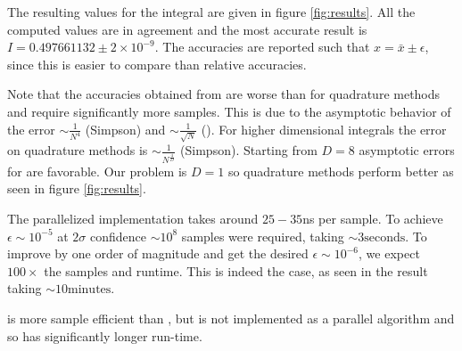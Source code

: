 \documentclass[10pt, a4paper]{article}
\newcommand{\final}{$I = 0.497661132 \pm 2\times10^{-9}$}
\begin{document}
  The resulting values for the integral are given in figure \ref{fig:results}. All the computed values
  are in agreement and the most accurate result is \final. The accuracies are reported such that
  $x = \bar x \pm \epsilon$, since this is easier to compare than relative accuracies.

  Note that the accuracies obtained from \is{} are worse than for quadrature methods and require
  significantly more samples. This is due to the asymptotic behavior of the error $\sim \frac{1}{N^4}$
  (Simpson) and $\sim \frac{1}{\sqrt{N}}$ (\is). For higher dimensional integrals the error on quadrature
  methods is $\sim \frac{1}{N^{\frac4D}}$ (Simpson). Starting from $D=8$ asymptotic errors for \is{}
  are favorable. Our problem is $D=1$ so quadrature methods perform better as seen in figure \ref{fig:results}.

  The parallelized \is{} implementation takes around $25-35$ns per sample. To achieve $\epsilon \sim 10^{-5}$
  at $2\sigma$ confidence $\sim 10^{8}$ samples were required, taking $\sim 3\text{seconds}$. To improve
  by one order of magnitude and get the desired $\epsilon \sim 10^{-6}$, we expect $100\times$ the
  samples and runtime. This is indeed the case, as seen in the \is{} result taking
  $\sim 10\text{minutes}$\footnotemark.


  \apis{} is more sample efficient than \is{}, but is not implemented as a parallel algorithm and
  so has significantly longer run-time.
\end{document}
